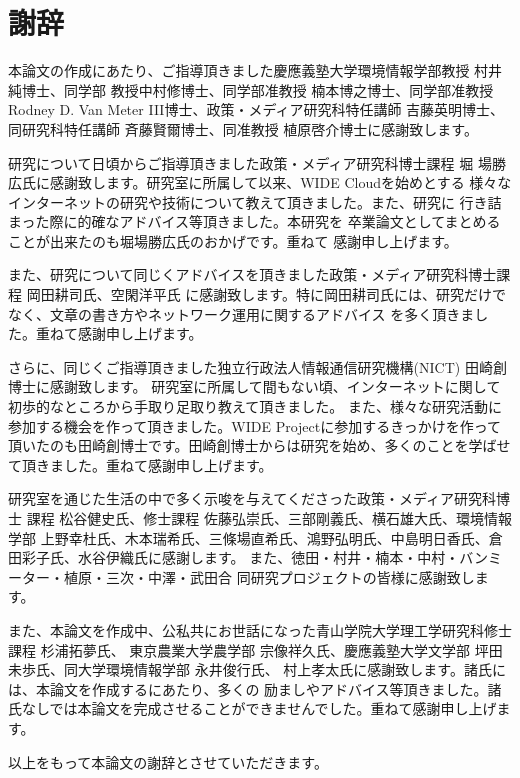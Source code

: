 \chapter*{謝辞}
\label{thanks}

本論文の作成にあたり、ご指導頂きました慶應義塾大学環境情報学部教授 村井
純博士、同学部 教授中村修博士、同学部准教授 楠本博之博士、同学部准教授 Rodney D.
Van Meter III博士、政策・メディア研究科特任講師 吉藤英明博士、同研究科特任講師 
斉藤賢爾博士、同准教授 植原啓介博士に感謝致します。

研究について日頃からご指導頂きました政策・メディア研究科博士課程 堀
場勝広氏に感謝致します。研究室に所属して以来、WIDE Cloudを始めとする
様々なインターネットの研究や技術について教えて頂きました。また、研究に
行き詰まった際に的確なアドバイス等頂きました。本研究を
卒業論文としてまとめることが出来たのも堀場勝広氏のおかげです。重ねて
感謝申し上げます。

また、研究について同じくアドバイスを頂きました政策・メディア研究科博士課程 岡田耕司氏、空閑洋平氏
に感謝致します。特に岡田耕司氏には、研究だけでなく、文章の書き方やネットワーク運用に関するアドバイス
を多く頂きました。重ねて感謝申し上げます。

さらに、同じくご指導頂きました独立行政法人情報通信研究機構(NICT) 田崎創博士に感謝致します。
研究室に所属して間もない頃、インターネットに関して初歩的なところから手取り足取り教えて頂きました。
また、様々な研究活動に参加する機会を作って頂きました。WIDE Projectに参加するきっかけを作って
頂いたのも田崎創博士です。田崎創博士からは研究を始め、多くのことを学ばせて頂きました。重ねて感謝申し上げます。

研究室を通じた生活の中で多く示唆を与えてくださった政策・メディア研究科博士
課程 松谷健史氏、修士課程 佐藤弘崇氏、三部剛義氏、横石雄大氏、環境情報学部
上野幸杜氏、木本瑞希氏、三條場直希氏、鴻野弘明氏、中島明日香氏、倉田彩子氏、水谷伊織氏に感謝します。
また、徳田・村井・楠本・中村・バンミーター・植原・三次・中澤・武田合
同研究プロジェクトの皆様に感謝致します。

また、本論文を作成中、公私共にお世話になった青山学院大学理工学研究科修士課程 杉浦拓夢氏、
東京農業大学農学部 宗像祥久氏、慶應義塾大学文学部 坪田未歩氏、同大学環境情報学部 永井俊行氏、
村上孝太氏に感謝致します。諸氏には、本論文を作成するにあたり、多くの
励ましやアドバイス等頂きました。諸氏なしでは本論文を完成させることができませんでした。重ねて感謝申し上げます。

以上をもって本論文の謝辞とさせていただきます。

